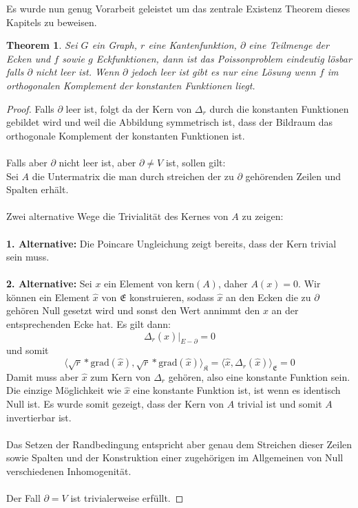\documentclass[11pt,a4paper,leqno]{report}
\newtheorem{theorem}{Theorem}[chapter]
\numberwithin{equation}{chapter}
\begin{document}
\noindent
Es wurde nun genug Vorarbeit geleistet um das zentrale Existenz Theorem dieses Kapitels zu beweisen.
\begin{theorem}
	Sei $G$ ein Graph, $r$ eine Kantenfunktion, $\partial$ eine Teilmenge der Ecken und $f$ sowie $g$ Eckfunktionen, dann ist das Poissonproblem eindeutig l\"osbar falls $\partial$ nicht leer ist. Wenn $\partial$ jedoch leer ist gibt es nur eine L\"osung wenn $f$ im orthogonalen Komplement der konstanten Funktionen liegt.
\end{theorem}
\begin{proof}
	Falls $\partial$ leer ist, folgt da der Kern von $\Delta_r$ durch die konstanten Funktionen gebildet wird und weil die Abbildung symmetrisch ist, dass der Bildraum das orthogonale Komplement der konstanten Funktionen ist.\\
	\\
	Falls aber $\partial$ nicht leer ist, aber $\partial\neq V$ ist, sollen gilt:\\
	Sei $A$ die Untermatrix die man durch streichen der zu $\partial$ geh\"orenden Zeilen und Spalten erh\"alt.\\
	\\
	Zwei alternative Wege die Trivialit\"at des Kernes von $A$ zu zeigen:\\
	\\
	\textbf{1. Alternative:} Die Poincare Ungleichung zeigt bereits, dass der Kern trivial sein muss.\\
	\\
	\textbf{2. Alternative:}  Sei $x$ ein Element von $\text{kern}(A)$, daher $A(x)=0$. Wir k\"onnen ein Element $\hat{x}$ von $\mathfrak{E}$ konstruieren, sodass $\hat{x}$ an den Ecken die zu $\partial$ geh\"oren Null gesetzt wird und sonst den Wert annimmt den $x$ an der entsprechenden Ecke hat. Es gilt dann:
	$$\Delta_r(\hat{x})|_{E-\partial} = 0$$
	und somit
	$$\langle \sqrt{r}*\text{grad}(\hat{x}),  \sqrt{r}*\text{grad}(\hat{x})\rangle_{\mathfrak{K}} = \langle \hat{x}, \Delta_r(\hat{x})\rangle_{\mathfrak{E}} = 0$$
	Damit muss aber $\hat{x}$ zum Kern von $\Delta_r$ geh\"oren, also eine konstante Funktion sein. Die einzige M\"oglichkeit wie $\hat{x}$ eine konstante Funktion ist, ist wenn es identisch Null ist. Es wurde somit gezeigt, dass der Kern von $A$ trivial ist und somit $A$ invertierbar ist.\\
	\\
	Das Setzen der Randbedingung entspricht aber genau dem Streichen dieser Zeilen sowie Spalten und der Konstruktion einer zugeh\"origen im Allgemeinen von Null verschiedenen Inhomogenit\"at.\\
	\\
	Der Fall $\partial=V$ ist trivialerweise erf\"ullt.
\end{proof}
\end{document}
